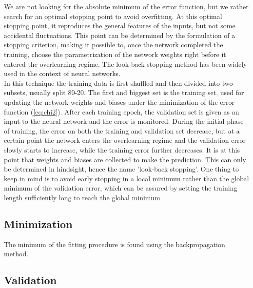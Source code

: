 We are not looking for the absolute minimum of the error function, but we rather search for an optimal stopping point to avoid overfitting. At this optimal stopping point, it reproduces the general features of the inputs, but not some accidental fluctuations. This point can be determined by the formulation of a stopping criterion, making it possible to, once the network completed the training, choose the parametrization of the network weights right before it entered the overlearning regime. The look-back stopping method has been widely used in the context of neural networks. \\
In this technique the training data is first shuffled and then divided into two subsets, usually split 80-20. The first and biggest set is the training set, used for updating the network weights and biases under the minimization of the error function (\ref{eq:chi2}). After each training epoch, the validation set is given as an input to the neural network and the error is monitored. During the initial phase of training, the error on both the training and validation set decrease, but at a certain point the network enters the overlearning regime and the validation error slowly starts to increase, while the training error further decreases. It is at this point that weights and biases are collected to make the prediction. This can only be determined in hindsight, hence the name 'look-back stopping'. One thing to keep in mind is to avoid early stopping in a local minimum rather than the global minimum of the validation error, which can be assured by setting the training length sufficiently long to reach the global minimum.

\subsection{Minimization}
The minimum of the fitting procedure is found using the backpropagation method. 

\subsection{Validation}

